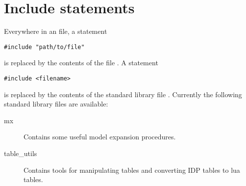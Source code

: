 \section{Include statements}
Everywhere in an \idp file, a statement 
\begin{lstlisting}
#include "path/to/file"
\end{lstlisting}
is replaced by the contents of the file .
A statement
\begin{lstlisting}
#include <filename>
\end{lstlisting}

is replaced by the contents of the standard library file .  Currently the following standard library files are available:
\begin{description}
\item[mx] Contains some useful model expansion procedures.
\item[table\_utils] Contains tools for manipulating tables and converting IDP tables to lua tables.
\end{description}
